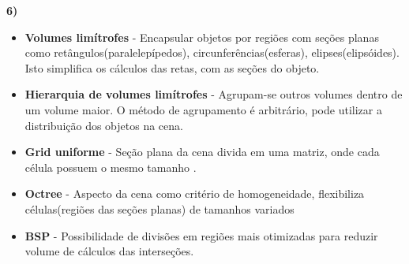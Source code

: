 \textbf{6)} 

\begin{itemize}
	\item \textbf{Volumes limítrofes} - Encapsular objetos por regiões com 
	seções planas como retângulos(paralelepípedos), circunferências(esferas),
	elipses(elipsóides). Isto simplifica os cálculos das retas, com as seções do objeto.
	
	\item \textbf{Hierarquia de volumes limítrofes} - Agrupam-se outros volumes dentro de um volume maior.
	O método de agrupamento é arbitrário, pode utilizar a distribuição dos objetos na cena.
	
	\item \textbf{Grid uniforme} - Seção plana da cena divida em uma matriz,
	onde cada célula possuem o mesmo tamanho .

	\item \textbf{Octree} - Aspecto da cena como critério de homogeneidade,
	flexibiliza células(regiões das seções planas) de tamanhos variados
	
	\item \textbf{BSP} - Possibilidade de divisões em regiões mais otimizadas 
	para reduzir volume de cálculos das interseções.
\end{itemize}